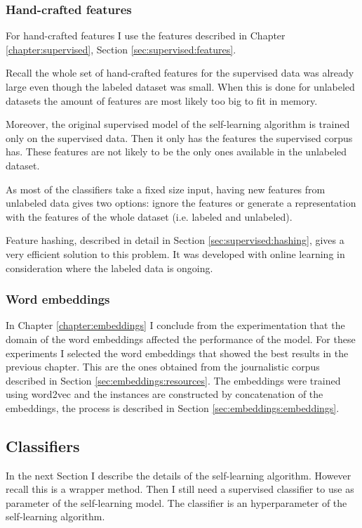 \subsubsection{Hand-crafted features}\label{sec:self-learning:handcrafted}

For hand-crafted features I use the features described in Chapter
\ref{chapter:supervised}, Section \ref{sec:supervised:features}. 

Recall the whole set of hand-crafted features for the supervised data was
already large even though the labeled dataset was small. When this is done for
unlabeled datasets the amount of features are most likely too big to fit in
memory.

Moreover, the original supervised model of the self-learning algorithm is
trained only on the supervised data. Then it only has the features the
supervised corpus has. These features are not likely to be the only ones
available in the unlabeled dataset.

As most of the classifiers take a fixed size input, having new features from
unlabeled data gives two options: ignore the features or generate a
representation with the features of the whole dataset (i.e. labeled and
unlabeled).

Feature hashing, described in detail in Section \ref{sec:supervised:hashing},
gives a very efficient solution to this problem. It was developed with online
learning in consideration where the labeled data is ongoing.

\subsubsection{Word embeddings}

In Chapter \ref{chapter:embeddings} I conclude from the experimentation that
the domain of the word embeddings affected the performance of the model. For
these experiments I selected the word embeddings that showed the best results
in the previous chapter. This are the ones obtained from the journalistic
corpus described in Section \ref{sec:embeddings:resources}. The embeddings
were trained using word2vec and the instances are constructed by concatenation
of the embeddings, the process is described in Section
\ref{sec:embeddings:embeddings}.

\subsection{Classifiers}

In the next Section I describe the details of the self-learning algorithm.
However recall this is a wrapper method. Then I still need a supervised
classifier to use as parameter of the self-learning model. The classifier is an
hyperparameter of the self-learning algorithm.

